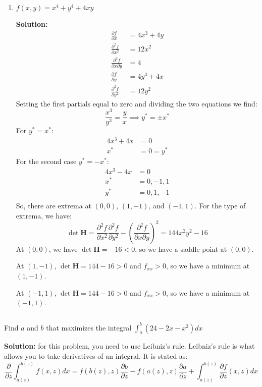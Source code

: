 \documentclass[letterpaper, 11pt]{article}
\begin{document}
\begin{enumerate}[label=(\alph*)]
\item $f(x,y) = x^4 +y^4 +4xy$
\par \textbf{Solution:}
\begin{align*}
\frac{\partial f}{\partial x} &= 4x^3 + 4y\\
\frac{\partial^2 f}{\partial x^2} &= 12x^2\\
\frac{\partial^2 f}{\partial x\partial y} &= 4\\
\frac{\partial f}{\partial y} &= 4y^3 + 4x \\
\frac{\partial^2 f}{\partial y^2} &=12y^2
\end{align*}
Setting the first partials equal to zero and dividing the two equations we find:
\[ \frac{x^3}{y^3} = \frac{y}{x} \implies y^* = \pm x^* \]
For $y^* = x^*$:
\begin{align*}
4x^3 + 4x &= 0 \\
x^* & = 0  = y^*
\end{align*}
For the second case $y^* = -x^*$:
\begin{align*}
4x^3 - 4x &= 0 \\
x^* & = 0, -1, 1\\
y^* &= 0, 1, -1\\
\end{align*} 
So, there are extrema at $(0,0)$, $(1,-1)$, and $(-1,1)$. For the type of extrema, we have:
\[ \det \bm{H} = \frac{\partial^2 f}{\partial x^2}\frac{\partial^2 f}{\partial y^2}- \left(\frac{\partial^2 f}{\partial x\partial y}\right)^2 = 144x^2 y^2 - 16 \]
At $(0,0)$, we have $\det \bm{H} = -16 < 0$, so we have a saddle point at $(0,0)$. 
\par At $(1,-1)$, $\det \bm{H} = 144 - 16 > 0$ and $f_{xx} > 0$, so we have a minimum at $(1,-1)$. 
\par At $(-1,1)$, $\det \bm{H} = 144 - 16 > 0$ and $f_{xx} > 0$, so we have a minimum at $(-1,1)$. 

\end{enumerate}

\subsection{} Find $a$ and $b$ that maximizes the integral $\int_a^b (24 - 2x - x^2)dx$
\par \textbf{Solution:} for this problem, you need to use Leibniz's rule. Leibniz's rule is what allows you to take derivatives of an integral. It is stated as:
\[ \frac{\partial}{\partial z} \int_{a(z)}^{b(z)} f(x,z)dx = f(b(z),z)\frac{\partial b }{\partial z} -  f(a(z),z)\frac{\partial a }{\partial z}  +  \int_{a(z)}^{b(z)} \frac{\partial f}{\partial z}(x,z)dx \]
\end{document}
